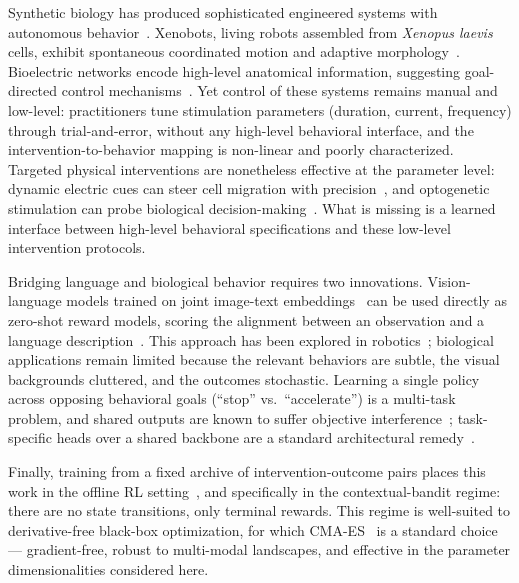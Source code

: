 \documentclass{article}
\begin{document}

Synthetic biology has produced sophisticated engineered systems with autonomous behavior~\cite{kriegman2021kinematic, blackiston2021cellular}. Xenobots, living robots assembled from \textit{Xenopus laevis} cells, exhibit spontaneous coordinated motion and adaptive morphology~\cite{kriegman2021kinematic}. Bioelectric networks encode high-level anatomical information, suggesting goal-directed control mechanisms~\cite{levin2021bioelectric}. Yet control of these systems remains manual and low-level: practitioners tune stimulation parameters (duration, current, frequency) through trial-and-error, without any high-level behavioral interface, and the intervention-to-behavior mapping is non-linear and poorly characterized. Targeted physical interventions are nonetheless effective at the parameter level: dynamic electric cues can steer cell migration with precision~\cite{zajdel2020scheepdog}, and optogenetic stimulation can probe biological decision-making~\cite{ebrahimkhani2021synthetic}. What is missing is a learned interface between high-level behavioral specifications and these low-level intervention protocols.




Bridging language and biological behavior requires two innovations. Vision-language models trained on joint image-text embeddings~\cite{radford2021learning, li2022blip} can be used directly as zero-shot reward models, scoring the alignment between an observation and a language description~\cite{rocamonde2023vision, Le2025zapgpt}. This approach has been explored in robotics~\cite{liang2023code, wang2024rl}; biological applications remain limited because the relevant behaviors are subtle, the visual backgrounds cluttered, and the outcomes stochastic. Learning a single policy across opposing behavioral goals (``stop'' vs.\ ``accelerate'') is a multi-task problem, and shared outputs are known to suffer objective interference~\cite{pcgrad, chen2018gradnorm}; task-specific heads over a shared backbone are a standard architectural remedy~\cite{wang2022can, ruder2017overview}. 

Finally, training from a fixed archive of intervention-outcome pairs places this work in the offline RL setting~\cite{levine2020offline}, and specifically in the contextual-bandit regime: there are no state transitions, only terminal rewards. This regime is well-suited to derivative-free black-box optimization, for which CMA-ES~\cite{hansen2001completely} is a standard choice — gradient-free, robust to multi-modal landscapes, and effective in the parameter dimensionalities considered here.
\end{document}
